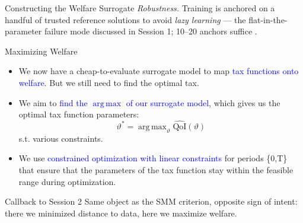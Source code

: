 \documentclass[10pt,aspectratio=169]{beamer}
\DeclareMathOperator*{\argmax}{arg\,max}
\begin{document}
\begin{frame}{Constructing the Welfare Surrogate}
\vspace{0.2em}
{\footnotesize \emph{Robustness.} Training is anchored on a handful of trusted reference solutions to avoid \emph{lazy learning} --- the flat-in-the-parameter failure mode discussed in Session 1; 10--20 anchors suffice \citep{friedlDeep2023}.}
\end{frame}

\begin{frame}{Maximizing Welfare}
\begin{itemize}
    \item We now have a cheap-to-evaluate surrogate model to map \textcolor{blue}{tax functions onto welfare}. But we still need to find the optimal tax.
    \vspace{0.3cm}
    \item We aim to \textcolor{blue}{find the $\argmax$ of our surrogate model}, which gives us the optimal tax function parameters:
    \[
       \vartheta^* = \argmax_{\vartheta} \widehat{\mathrm{QoI}}(\vartheta)
    \]
    s.t. various constraints.
    \vspace{0.3cm}
    \item We use \textcolor{blue}{constrained optimization with linear constraints} for periods \{0,T\} that ensure that the parameters of the tax function stay within the feasible range during optimization.
    \end{itemize}
\vspace{0.3cm}
\begin{block}{Callback to Session 2}
Same object as the SMM criterion, opposite sign of intent: there we minimized distance to data, here we maximize welfare.
\end{block}
\end{frame}
\end{document}

